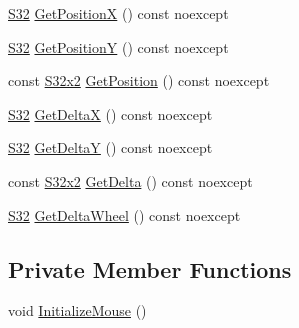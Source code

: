 \begin{DoxyCompactItemize}
\item 
\hyperlink{namespacemage_a642e05c5c83642b6946703615cdbf2da}{S32} \hyperlink{classmage_1_1input_1_1_mouse_1_1_impl_a3446d3bd42aa376e1c3d877cf24a232b}{Get\+PositionX} () const noexcept
\item 
\hyperlink{namespacemage_a642e05c5c83642b6946703615cdbf2da}{S32} \hyperlink{classmage_1_1input_1_1_mouse_1_1_impl_a5c03e19ff1a384aa6fd9ae5d7c603c9a}{Get\+PositionY} () const noexcept
\item 
const \hyperlink{namespacemage_a02de5a44f35ee9917e5788d63795fece}{S32x2} \hyperlink{classmage_1_1input_1_1_mouse_1_1_impl_acdbd3171b86d0845139d71d55ab23022}{Get\+Position} () const noexcept
\item 
\hyperlink{namespacemage_a642e05c5c83642b6946703615cdbf2da}{S32} \hyperlink{classmage_1_1input_1_1_mouse_1_1_impl_a61e7ce497a1779fcd58bce1bf067abfe}{Get\+DeltaX} () const noexcept
\item 
\hyperlink{namespacemage_a642e05c5c83642b6946703615cdbf2da}{S32} \hyperlink{classmage_1_1input_1_1_mouse_1_1_impl_accce0b038c380bf32625de965a83e1db}{Get\+DeltaY} () const noexcept
\item 
const \hyperlink{namespacemage_a02de5a44f35ee9917e5788d63795fece}{S32x2} \hyperlink{classmage_1_1input_1_1_mouse_1_1_impl_aa255160dc9930673d94672ae1e9f43e8}{Get\+Delta} () const noexcept
\item 
\hyperlink{namespacemage_a642e05c5c83642b6946703615cdbf2da}{S32} \hyperlink{classmage_1_1input_1_1_mouse_1_1_impl_ad2cd4f1d06038ab71e9db2802598bd16}{Get\+Delta\+Wheel} () const noexcept
\end{DoxyCompactItemize}
\subsection*{Private Member Functions}
\begin{DoxyCompactItemize}
\item 
void \hyperlink{classmage_1_1input_1_1_mouse_1_1_impl_ae290eaa8d1db619a3123f88e452d382a}{Initialize\+Mouse} ()
\end{DoxyCompactItemize}
